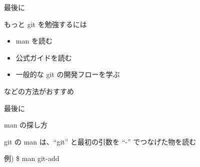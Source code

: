 % 
% 
% 
% 

\begin{frame}[t]{最後に}{}

  もっと git を勉強するには
  \vspace{2ex}

  \begin{itemize}
  \item man を読む
  \item 公式ガイドを読む
  \item 一般的な git の開発フローを学ぶ
  \end{itemize}
  \vspace{2ex}

  などの方法がおすすめ

\end{frame}

\begin{frame}[t]{最後に}{}

  man の探し方
  \vspace{2ex}

  git の man は、``git'' と最初の引数を ``-'' でつなげた物を読む

  例) \$ man git-add
  \vspace{2ex}

  \vspace{2ex}

\end{frame}


